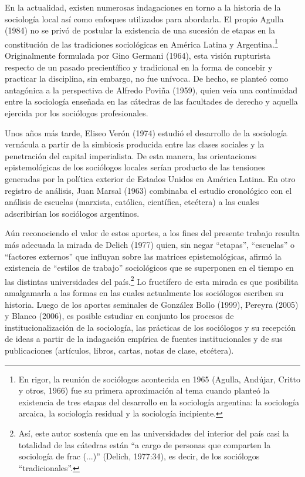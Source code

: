 En la actualidad, existen numerosas indagaciones en torno a la historia de la sociología local así como enfoques utilizados para abordarla. El propio Agulla (1984) no se privó de postular la existencia de una sucesión de etapas en la constitución de las tradiciones sociológicas en América Latina y Argentina.\footnote{En rigor, la reunión de sociólogos acontecida en 1965 (Agulla, Andújar, Critto y otros, 1966) fue su primera aproximación al tema cuando planteó la existencia de tres etapas del desarrollo en la sociología argentina: la sociología arcaica, la sociología residual y la sociología incipiente.} Originalmente formulada por Gino Germani (1964), esta visión rupturista respecto de un pasado precientífico y tradicional en la forma de concebir y practicar la disciplina, sin embargo, no fue unívoca. De hecho, se planteó como antagónica a la perspectiva de Alfredo Poviña (1959), quien veía una continuidad entre la sociología enseñada en las cátedras de las facultades de derecho y aquella ejercida por los sociólogos profesionales.

Unos años más tarde, Eliseo Verón (1974) estudió el desarrollo de la sociología vernácula a partir de la simbiosis producida entre las clases sociales y la penetración del capital imperialista. De esta manera, las orientaciones epistemológicas de los sociólogos locales serían producto de las tensiones generadas por la política exterior de Estados Unidos en América Latina. En otro registro de análisis, Juan Marsal (1963) combinaba el estudio cronológico con el análisis de escuelas (marxista, católica, científica, etcétera) a las cuales adscribirían los sociólogos argentinos.

Aún reconociendo el valor de estos aportes, a los fines del presente trabajo resulta más adecuada la mirada de Delich (1977) quien, sin negar ``etapas'', ``escuelas'' o ``factores externos'' que influyan sobre las matrices epistemológicas, afirmó la existencia de ``estilos de trabajo'' sociológicos que se superponen en el tiempo en las distintas universidades del país.\footnote{Así, este autor sostenía que en las universidades del interior del país casi la totalidad de las cátedras están ``a cargo de personas que comparten la sociología de frac (...)'' (Delich, 1977:34), es decir, de los sociólogos ``tradicionales''.} Lo fructífero de esta mirada es que posibilita amalgamarla a las formas en las cuales actualmente los sociólogos escriben su historia. Luego de los aportes seminales de González Bollo (1999), Pereyra (2005) y Blanco (2006), es posible estudiar en conjunto los procesos de institucionalización de la sociología, las prácticas de los sociólogos y su recepción de ideas a partir de la indagación empírica de fuentes institucionales y de sus publicaciones (artículos, libros, cartas, notas de clase, etcétera).

